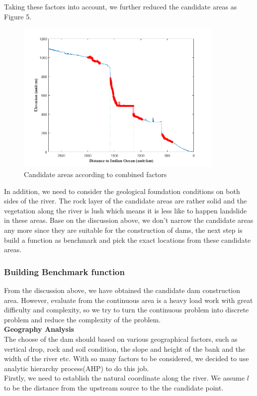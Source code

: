 \documentclass{mcmthesis}
\begin{document}
\indent Taking these factors into account, we further reduced the candidate areas as Figure 5.
\begin{figure}[h]
\small
\centering
\includegraphics[width=10cm]{./figures/highlight1.png}
\caption{Candidate areas according to combined factors} \label{fig:Fig4}
\end{figure}
\indent In addition, we need to consider the geological foundation conditions on both sides of the river. The rock layer of the candidate areas are rather solid and the vegetation along the river is lush which means it is less like to happen landslide in these areas. Base on the discussion above, we don't narrow the candidate areas any more since they are suitable for the construction of dams, the next step is build a function as benchmark and pick the exact locations from these candidate areas.

\subsubsection{Building Benchmark function}
\indent \indent From the discussion above, we have obtained the candidate dam construction area. However, evaluate from the continuous area is a heavy load work with great difficulty and complexity, so we try to turn the continuous problem into discrete problem and reduce the complexity of the problem.\\

\textbf{Geography Analysis}\\
\indent The choose of the dam should based on various geographical factors, such as vertical drop, rock and soil condition, the slope and height of the bank and the width of the river etc. With so many factors to be considered, we decided to use analytic hierarchy process(AHP) to do this job.\\
\indent Firstly, we need to establish the natural coordinate along the river. We assume $l$ to be the distance from the upstream source to the the candidate point.
\end{document}

